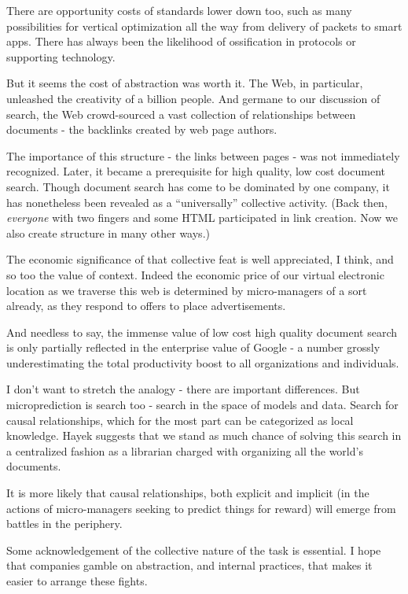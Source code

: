There are opportunity costs of standards lower down too, such as many possibilities for vertical optimization all the way from delivery of packets to smart apps. There has always been the likelihood of ossification in protocols or supporting technology. 


But it seems the cost of abstraction was worth it. The Web, in particular, unleashed the creativity of a billion people. And germane to our discussion of search, the Web crowd-sourced a vast collection of relationships between documents - the backlinks created by web page authors. 

The importance of this structure - the links between pages - was not immediately recognized. Later, it became a prerequisite for high quality, low cost document search. Though document search has come to be dominated by one company, it has nonetheless been revealed as a ``universally'' collective activity. (Back then, {\em everyone} with two fingers and some HTML participated in link creation. Now we also create structure in many other ways.)  


The economic significance of that collective feat is well appreciated, I think, and so too the value of context. Indeed the economic price of our virtual electronic location as we traverse this web is determined by micro-managers of a sort already, as they respond to offers to place advertisements. 


And needless to say, the immense value of low cost high quality document search is only partially reflected in the enterprise value of Google - a number grossly underestimating the total productivity boost to all organizations and individuals.   

I don't want to stretch the analogy - there are important differences. But microprediction is search too - search in the space of models and data. Search for causal relationships, which for the most part can be categorized as local knowledge. Hayek suggests that we stand as much chance of solving this search in a centralized fashion as a librarian charged with organizing all the world's documents. 

It is more likely that causal relationships, both explicit and implicit (in the actions of micro-managers seeking to predict things for reward) will emerge from battles in the periphery. 

Some acknowledgement of the collective nature of the task is essential. I hope that companies gamble on abstraction, and internal practices, that makes it easier to arrange these fights.


